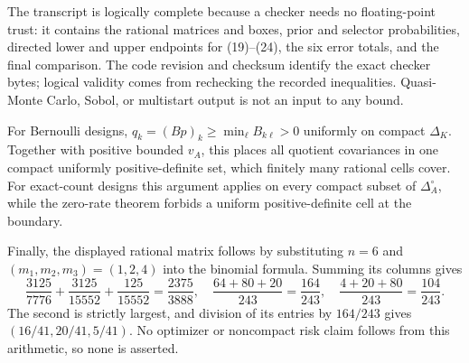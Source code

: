 The transcript is logically complete because a checker needs no floating-point trust: it contains the rational matrices and boxes, prior and selector probabilities, directed lower and upper endpoints for (19)--(24), the six error totals, and the final comparison.  The code revision and checksum identify the exact checker bytes; logical validity comes from rechecking the recorded inequalities.  Quasi-Monte Carlo, Sobol, or multistart output is not an input to any bound.

For Bernoulli designs, \(q_k=(Bp)_k\geq\min_\ell B_{k\ell}>0\) uniformly on compact \(\Delta_K\).  Together with positive bounded \(v_A\), this places all quotient covariances in one compact uniformly positive-definite set, which finitely many rational cells cover.  For exact-count designs this argument applies on every compact subset of \(\Delta_A^\circ\), while the zero-rate theorem forbids a uniform positive-definite cell at the boundary.

Finally, the displayed rational matrix follows by substituting \(n=6\) and \((m_1,m_2,m_3)=(1,2,4)\) into the binomial formula.  Summing its columns gives
\[
\frac{3125}{7776}+\frac{3125}{15552}+\frac{125}{15552}=\frac{2375}{3888},
\quad \frac{64+80+20}{243}=\frac{164}{243},
\quad \frac{4+20+80}{243}=\frac{104}{243}.
\]
The second is strictly largest, and division of its entries by \(164/243\) gives \((16/41,20/41,5/41)\).  No optimizer or noncompact risk claim follows from this arithmetic, so none is asserted.